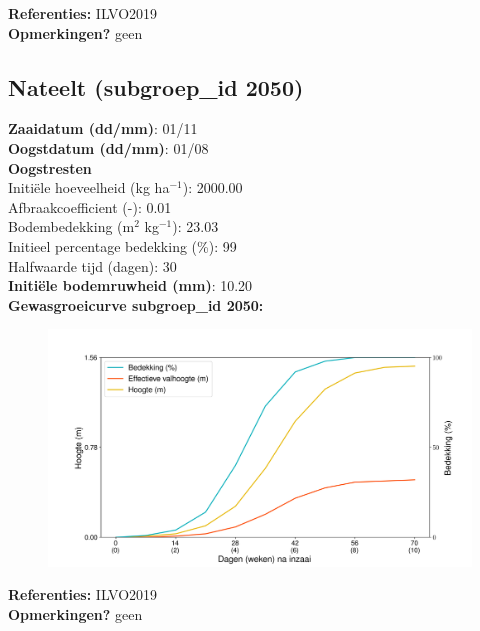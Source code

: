 \documentclass{article}
\begin{document}
  \textbf{Referenties:} ILVO2019 \vspace{0.10cm} \\ 
  \textbf{Opmerkingen?} geen \vspace{0.10cm} \\ 
 \newpage 
 \subsection{Nateelt (subgroep\_id 2050)} 
  \textbf{Zaaidatum (dd/mm)}: 01/11  \vspace{0.10cm} \\ 
  \textbf{Oogstdatum (dd/mm)}: 01/08  \vspace{0.10cm} \\ 
  \textbf{Oogstresten} \vspace{0.05cm} \\ 
  \tab Initi\"{e}le hoeveelheid (kg ha$^{-1}$): 2000.00 \vspace{0.05cm} \\ 
  \tab Afbraakcoefficient (-): 0.01 \vspace{0.05cm} \\ 
  \tab Bodembedekking (m$^2$ kg$^{-1}$): 23.03 \vspace{0.05cm} \\ 
  \tab Initieel percentage bedekking (\%): 99 \vspace{0.05cm} \\ 
  \tab Halfwaarde tijd (dagen): 30 \vspace{0.05cm} \\ 
  \textbf{Initi\"{e}le bodemruwheid (mm)}: 10.20 \vspace{0.05cm} \\ 
  \textbf{Gewasgroeicurve subgroep\_id 2050:} 
 \begin{center} \begin{figure}[H] \includegraphics[width=12.5cm]{temp/2050.png} \end{figure} \end{center} 
  \textbf{Referenties:} ILVO2019 \vspace{0.10cm} \\ 
  \textbf{Opmerkingen?} geen \vspace{0.10cm} \\ 
 \newpage 
\end{document}
